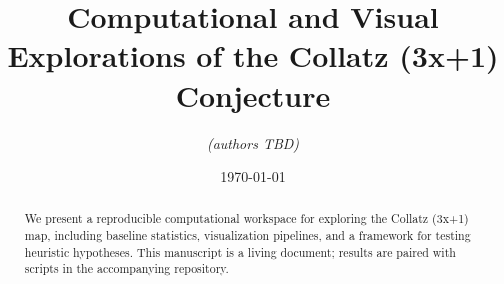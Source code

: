\documentclass[11pt]{article}
\title{Computational and Visual Explorations of the Collatz (3x+1) Conjecture}
\author{\textit{(authors TBD)}}
\date{\today}
\begin{document}
\maketitle

\begin{abstract}
We present a reproducible computational workspace for exploring the Collatz (3x+1) map, including baseline statistics, visualization pipelines, and a framework for testing heuristic hypotheses. This manuscript is a living document; results are paired with scripts in the accompanying repository.
\end{abstract}













\appendix

\end{document}
